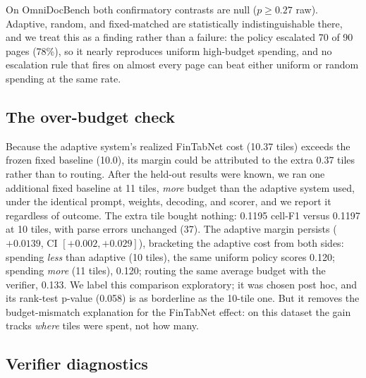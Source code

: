\documentclass[conference]{IEEEtran}
\begin{document}
On OmniDocBench both confirmatory contrasts are null ($p \ge 0.27$ raw).
Adaptive, random, and fixed-matched are statistically indistinguishable
there, and we treat this as a finding rather than a failure: the policy
escalated 70 of 90 pages (78\%), so it nearly reproduces uniform
high-budget spending, and no escalation rule that fires on almost every
page can beat either uniform or random spending at the same rate.

\subsection{The over-budget check}
\label{sec:overmatch}

Because the adaptive system's realized FinTabNet cost (10.37 tiles)
exceeds the frozen fixed baseline (10.0), its margin could be attributed
to the extra 0.37 tiles rather than to routing. After the held-out
results were known, we ran one additional fixed baseline at 11 tiles,
\emph{more} budget than the adaptive system used, under the identical
prompt, weights, decoding, and scorer, and we report it regardless of
outcome. The extra tile bought nothing: 0.1195 cell-F1 versus 0.1197 at
10 tiles, with parse errors unchanged (37). The adaptive margin persists
($+0.0139$, CI $[+0.002, +0.029]$), bracketing the adaptive cost from
both sides: spending \emph{less} than adaptive (10 tiles), the same
uniform policy scores 0.120; spending \emph{more} (11 tiles), 0.120;
routing the same average budget with the verifier, 0.133. We label this
comparison exploratory; it was chosen post hoc, and its rank-test
p-value (0.058) is as borderline as the 10-tile one. But it removes
the budget-mismatch explanation for the FinTabNet effect: on this
dataset the gain tracks \emph{where} tiles were spent, not how many.

\subsection{Verifier diagnostics}
\label{sec:diagnostics}
\end{document}
